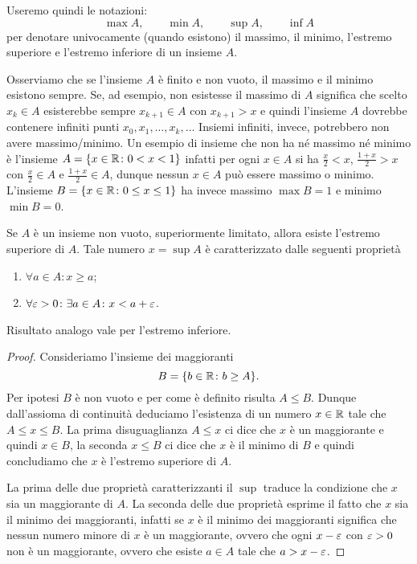 Useremo quindi le notazioni:
\mynote{$\max$ $\min$ $\sup$ $\inf$}%
%
%
%
%
\index{$\sup$}%
\index{$\inf$}%
\index{$\max$}%
\index{$\min$}%
\[
  \max A, \qquad
  \min A, \qquad
  \sup A, \qquad
  \inf A
\]
per denotare univocamente (quando esistono) il massimo, il minimo,
l'estremo superiore e l'estremo inferiore di un insieme $A$.

Osserviamo che se l'insieme $A$ è finito e non vuoto,
il massimo e il minimo esistono
sempre.
Se, ad esempio, non esistesse il massimo di $A$ significa che scelto
$x_k\in A$ esisterebbe sempre $x_{k+1}\in A$ con $x_{k+1} > x$ e quindi l'insieme
$A$ dovrebbe contenere infiniti punti $x_0,x_1, \dots, x_k,\dots $
Insiemi infiniti, invece, potrebbero non avere massimo/minimo.
Un esempio di insieme che non ha né massimo né minimo è
l'insieme $A = {\left\{ x\in \mathbb R\colon 0<x<1 \right\}}$ infatti per ogni
$x\in A$ si ha $\frac x 2<x$, $\frac{1+x}{2}>x$
con $\frac x 2\in A$ e $\frac{1+x}{2}\in A$,
dunque nessun $x\in A$ può essere
massimo o minimo. L'insieme $B={\left\{ x\in \mathbb R \colon 0\le x \le 1 \right\}}$
ha invece massimo $\max B= 1$ e minimo $\min B=0$.

\begin{theorem}
  \label{th:sup}
  \mymark{**}
  Se $A$ è un insieme non vuoto,
  superiormente limitato, allora esiste l'estremo superiore di $A$.
  Tale numero $x=\sup A$ è caratterizzato dalle seguenti proprietà
  \begin{enumerate}
  \item $\forall a\in A\colon x \ge a$;
  \item $\forall \varepsilon>0\colon \exists a\in A \colon x < a + \varepsilon$.
  \end{enumerate}

  Risultato analogo vale per l'estremo inferiore.
  \end{theorem}
  \begin{proof}
  \mymark{*}
  Consideriamo l'insieme dei maggioranti
  \[
  B = {\left\{  b\in \mathbb R \colon b \ge A \right\}}.
  \]
  Per ipotesi $B$ è non vuoto e per come è definito risulta $A\le B$.
  Dunque dall'assioma di continuità deduciamo l'esistenza di un numero $x\in \mathbb R$
  tale che $A\le x \le B$. La prima disuguaglianza $A\le x$ ci dice che $x$ è un
  maggiorante e quindi $x\in B$, la seconda $x\le B$ ci dice che $x$ è il minimo
  di $B$ e quindi concludiamo che $x$ è l'estremo superiore di $A$.

  La prima delle due proprietà caratterizzanti il $\sup$ traduce la condizione
  che $x$ sia un maggiorante di $A$. La seconda delle due proprietà esprime il
  fatto che $x$ sia il minimo dei maggioranti, infatti se $x$ è il minimo
  dei maggioranti significa che nessun numero minore di $x$ è un maggiorante, ovvero
  che ogni $x-\varepsilon$ con $\varepsilon>0$ non è un maggiorante, ovvero
  che esiste $a\in A$ tale che $a > x-\varepsilon$.
\end{proof}

